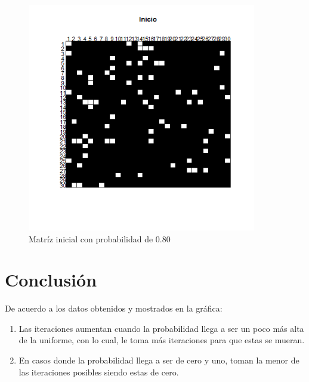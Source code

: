 \documentclass{article}
\begin{document}
\begin{figure}[h!]
\centering\includegraphics[width=100mm]{p2_Rep1_t0.png}
\caption{Matr\'iz inicial con probabilidad de 0.80}
\label{fig:Matriz}
\end{figure}

\section{Conclusi\'on}

De acuerdo a los datos obtenidos y mostrados en la gr\'afica:

\begin{enumerate}

\item{Las iteraciones aumentan cuando la probabilidad llega a ser un poco m\'as alta de la uniforme, con lo cual, le toma m\'as iteraciones para que estas se mueran.}

\item{En casos donde la probabilidad llega a ser de cero y uno, toman la menor de las iteraciones posibles siendo estas de cero.}

\end{enumerate}

\newpage



\end{document}
